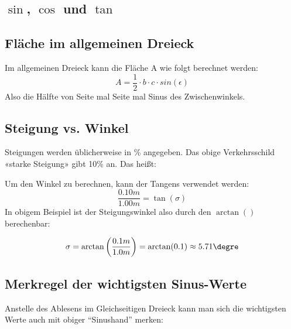 \subsection{$\sin{}$, $\cos{}$ und $\tan{}$}


\newpage
\subsection{Fläche im allgemeinen Dreieck}


Im allgemeinen Dreieck kann die Fläche A wie folgt berechnet werden:
$$A = \frac{1}{2}\cdot{}b\cdot{}c\cdot{}sin(\epsilon)$$
Also die Hälfte von Seite mal Seite mal Sinus des Zwischenwinkels.
\newpage


\subsection{Steigung vs. Winkel}


Steigungen werden üblicherweise in \% angegeben. Das obige
Verkehrsschild «starke Steigung» gibt 10\% an. Das heißt:


Um den Winkel zu berechnen, kann der Tangens verwendet werden:
$$\frac{0.10m}{1.00m} = \tan(\sigma)$$
In obigem Beispiel ist der Steigungswinkel also durch den $\arctan()$
berechenbar:

$$\sigma = \arctan\left(\frac{0.1m}{1.0m}\right) = \arctan(0.1) \approx 5.71\degre$$
\newpage
\subsection{Merkregel der wichtigsten Sinus-Werte}
Anstelle des Ablesens im Gleichseitigen Dreieck kann man sich die wichtigsten Werte
auch mit obiger ``Sinushand'' merken:

